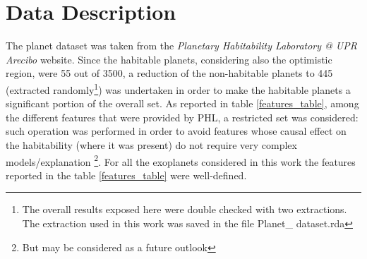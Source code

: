 \documentclass[
12pt, %
a4paper, %
oneside, %
headinclude,footinclude, %
BCOR5mm, %
]{scrartcl}
\begin{document}
\clearpage

\section{Data Description}

The planet dataset was taken from the \textit{Planetary Habitability Laboratory @ UPR Arecibo} \cite{planet_dataset} website. Since the habitable planets, considering also the optimistic region, were  55 out of 3500, a reduction of the non-habitable planets to 445 (extracted randomly\footnote{The overall results exposed here were double checked with two extractions. The extraction used in this work was saved in the file Planet\_ dataset.rda }) was undertaken in order to make the habitable planets a significant portion of the overall set. As reported in table \ref{features_table}, among the different features that were provided by PHL, a restricted set was considered: such operation was performed in order to avoid features whose causal effect on the habitability (where it was present) do not require very complex models/explanation \footnote{But may be considered as a future outlook}. For all the exoplanets considered in this work the features reported in the table \ref{features_table} were well-defined. 
 
\end{document}
